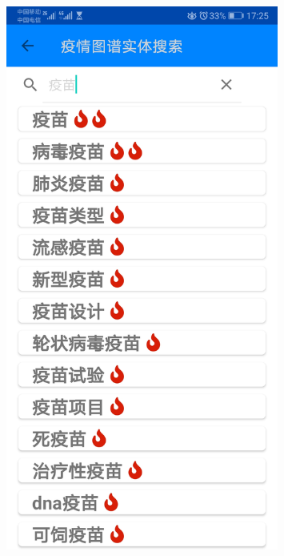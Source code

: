 \documentclass[UTF8]{article}
\begin{document}
\begin{figure}[htbp]
{\begin{minipage}[t]{0.25\linewidth}
        \includegraphics[width=0.8\textwidth]{searchentity2}
        \end{minipage}%
        }%
\end{figure}
\end{document}

